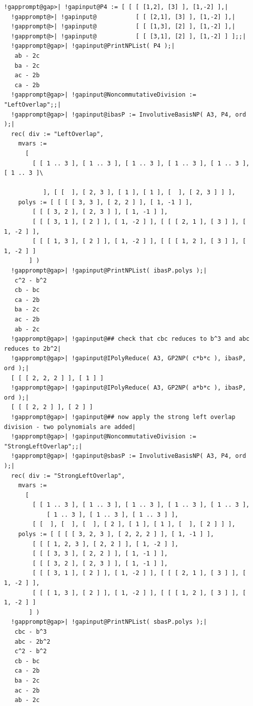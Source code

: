 \documentclass[a4paper,11pt]{report}
\begin{document}
{{\begin{Verbatim}[commandchars=!@|,fontsize=\small,frame=single,label=Example]
  !gapprompt@gap>| !gapinput@P4 := [ [ [ [1,2], [3] ], [1,-2] ],|
  !gapprompt@>| !gapinput@           [ [ [2,1], [3] ], [1,-2] ],|
  !gapprompt@>| !gapinput@           [ [ [1,3], [2] ], [1,-2] ],|
  !gapprompt@>| !gapinput@           [ [ [3,1], [2] ], [1,-2] ] ];;|
  !gapprompt@gap>| !gapinput@PrintNPList( P4 );|
   ab - 2c 
   ba - 2c 
   ac - 2b 
   ca - 2b 
  !gapprompt@gap>| !gapinput@NoncommutativeDivision := "LeftOverlap";;|
  !gapprompt@gap>| !gapinput@ibasP := InvolutiveBasisNP( A3, P4, ord );|
  rec( div := "LeftOverlap", 
    mvars := 
      [ 
        [ [ 1 .. 3 ], [ 1 .. 3 ], [ 1 .. 3 ], [ 1 .. 3 ], [ 1 .. 3 ], [ 1 .. 3 ]\
   
           ], [ [  ], [ 2, 3 ], [ 1 ], [ 1 ], [  ], [ 2, 3 ] ] ], 
    polys := [ [ [ [ 3, 3 ], [ 2, 2 ] ], [ 1, -1 ] ], 
        [ [ [ 3, 2 ], [ 2, 3 ] ], [ 1, -1 ] ], 
        [ [ [ 3, 1 ], [ 2 ] ], [ 1, -2 ] ], [ [ [ 2, 1 ], [ 3 ] ], [ 1, -2 ] ], 
        [ [ [ 1, 3 ], [ 2 ] ], [ 1, -2 ] ], [ [ [ 1, 2 ], [ 3 ] ], [ 1, -2 ] ] 
       ] )
  !gapprompt@gap>| !gapinput@PrintNPList( ibasP.polys );|
   c^2 - b^2 
   cb - bc 
   ca - 2b 
   ba - 2c 
   ac - 2b 
   ab - 2c 
  !gapprompt@gap>| !gapinput@## check that cbc reduces to b^3 and abc reduces to 2b^2|
  !gapprompt@gap>| !gapinput@IPolyReduce( A3, GP2NP( c*b*c ), ibasP, ord );|
  [ [ [ 2, 2, 2 ] ], [ 1 ] ]
  !gapprompt@gap>| !gapinput@IPolyReduce( A3, GP2NP( a*b*c ), ibasP, ord );|
  [ [ [ 2, 2 ] ], [ 2 ] ]
  !gapprompt@gap>| !gapinput@## now apply the strong left overlap division - two polynomials are added|
  !gapprompt@gap>| !gapinput@NoncommutativeDivision := "StrongLeftOverlap";;|
  !gapprompt@gap>| !gapinput@sbasP := InvolutiveBasisNP( A3, P4, ord );|
  rec( div := "StrongLeftOverlap", 
    mvars := 
      [ 
        [ [ 1 .. 3 ], [ 1 .. 3 ], [ 1 .. 3 ], [ 1 .. 3 ], [ 1 .. 3 ], 
            [ 1 .. 3 ], [ 1 .. 3 ], [ 1 .. 3 ] ], 
        [ [  ], [  ], [  ], [ 2 ], [ 1 ], [ 1 ], [  ], [ 2 ] ] ], 
    polys := [ [ [ [ 3, 2, 3 ], [ 2, 2, 2 ] ], [ 1, -1 ] ], 
        [ [ [ 1, 2, 3 ], [ 2, 2 ] ], [ 1, -2 ] ], 
        [ [ [ 3, 3 ], [ 2, 2 ] ], [ 1, -1 ] ], 
        [ [ [ 3, 2 ], [ 2, 3 ] ], [ 1, -1 ] ], 
        [ [ [ 3, 1 ], [ 2 ] ], [ 1, -2 ] ], [ [ [ 2, 1 ], [ 3 ] ], [ 1, -2 ] ], 
        [ [ [ 1, 3 ], [ 2 ] ], [ 1, -2 ] ], [ [ [ 1, 2 ], [ 3 ] ], [ 1, -2 ] ] 
       ] )
  !gapprompt@gap>| !gapinput@PrintNPList( sbasP.polys );|
   cbc - b^3 
   abc - 2b^2 
   c^2 - b^2 
   cb - bc 
   ca - 2b 
   ba - 2c 
   ac - 2b 
   ab - 2c 
  
\end{Verbatim}
 

}}
\end{document}
